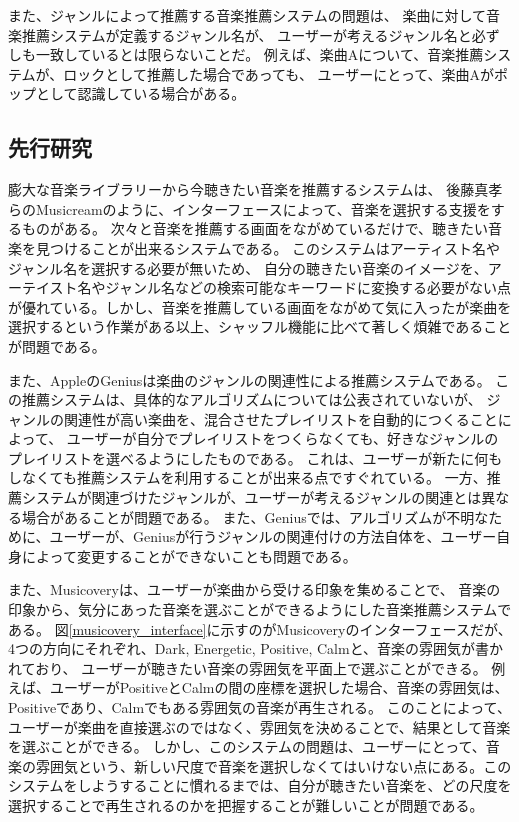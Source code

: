 \documentclass[11pt, onecolumn]{jsarticle}
\begin{document}
また、ジャンルによって推薦する音楽推薦システムの問題は、
楽曲に対して音楽推薦システムが定義するジャンル名が、
ユーザーが考えるジャンル名と必ずしも一致しているとは限らないことだ。
例えば、楽曲Aについて、音楽推薦システムが、ロックとして推薦した場合であっても、
ユーザーにとって、楽曲Aがポップとして認識している場合がある。


\subsection{先行研究}
膨大な音楽ライブラリーから今聴きたい音楽を推薦するシステムは、
後藤真孝らのMusicreamのように、インターフェースによって、音楽を選択する支援をするものがある。
次々と音楽を推薦する画面をながめているだけで、聴きたい音楽を見つけることが出来るシステムである。
このシステムはアーティスト名やジャンル名を選択する必要が無いため、
自分の聴きたい音楽のイメージを、アーテイスト名やジャンル名などの検索可能なキーワードに変換する必要がない点が優れている。しかし、音楽を推薦している画面をながめて気に入ったが楽曲を選択するという作業がある以上、シャッフル機能に比べて著しく煩雑であることが問題である。

また、AppleのGeniusは楽曲のジャンルの関連性による推薦システムである。
この推薦システムは、具体的なアルゴリズムについては公表されていないが、
ジャンルの関連性が高い楽曲を、混合させたプレイリストを自動的につくることによって、
ユーザーが自分でプレイリストをつくらなくても、好きなジャンルのプレイリストを選べるようにしたものである。
これは、ユーザーが新たに何もしなくても推薦システムを利用することが出来る点ですぐれている。
一方、推薦システムが関連づけたジャンルが、ユーザーが考えるジャンルの関連とは異なる場合があることが問題である。
また、Geniusでは、アルゴリズムが不明なために、ユーザーが、Geniusが行うジャンルの関連付けの方法自体を、ユーザー自身によって変更することができないことも問題である。

また、Musicoveryは、ユーザーが楽曲から受ける印象を集めることで、
音楽の印象から、気分にあった音楽を選ぶことができるようにした音楽推薦システムである。
図\ref{musicovery_interface}に示すのがMusicoveryのインターフェースだが、
4つの方向にそれぞれ、Dark, Energetic, Positive, Calmと、音楽の雰囲気が書かれており、
ユーザーが聴きたい音楽の雰囲気を平面上で選ぶことができる。
例えば、ユーザーがPositiveとCalmの間の座標を選択した場合、音楽の雰囲気は、Positiveであり、Calmでもある雰囲気の音楽が再生される。
このことによって、ユーザーが楽曲を直接選ぶのではなく、雰囲気を決めることで、結果として音楽を選ぶことができる。
しかし、このシステムの問題は、ユーザーにとって、音楽の雰囲気という、新しい尺度で音楽を選択しなくてはいけない点にある。このシステムをしようすることに慣れるまでは、自分が聴きたい音楽を、どの尺度を選択することで再生されるのかを把握することが難しいことが問題である。
\end{document}
